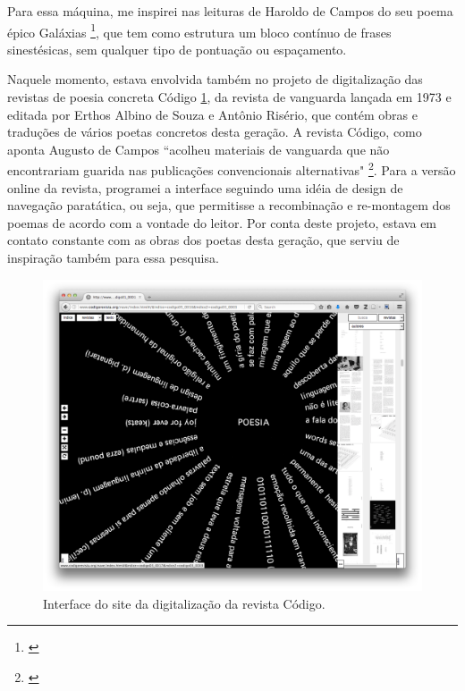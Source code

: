 Para essa máquina, me inspirei nas leituras de Haroldo de Campos do seu poema épico Galáxias \footnote{\cite{Campos2004}}, que tem como estrutura um bloco contínuo de frases sinestésicas, sem qualquer tipo de pontuação ou espaçamento. 

Naquele momento, estava envolvida também no projeto de digitalização das revistas de poesia concreta Código \ref{codigo}, da revista de vanguarda lançada em 1973 e editada por Erthos Albino de Souza e Antônio Risério, que contém obras e traduções de vários poetas concretos desta geração. A revista Código, como aponta Augusto de Campos ``acolheu materiais de vanguarda que não encontrariam guarida nas publicações convencionais alternativas" \footnote{\cite{Scandurra2016}}. Para a versão online da revista, programei a interface seguindo uma idéia de design de navegação paratática, ou seja, que permitisse a recombinação e re-montagem dos poemas de acordo com a vontade do leitor. Por conta deste projeto, estava em contato constante com as obras dos poetas desta geração, que serviu de inspiração também para essa pesquisa.

\begin{figure}
    \caption{\label{codigo}Interface do site da digitalização da revista Código. }
    \begin{center}
    \includegraphics[width=1\linewidth]{pictures/cap3/codigo5.png}
    \end{center}
\end{figure}

